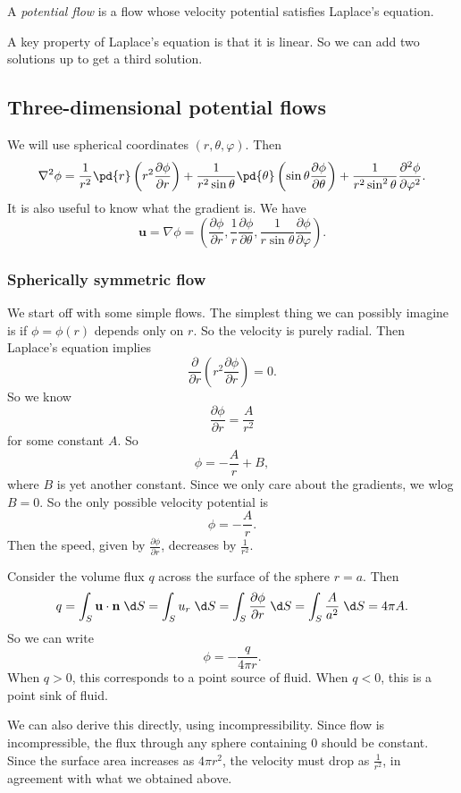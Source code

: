 \documentclass[a4paper]{article}
\begin{document}
\begin{defi}
  A \emph{potential flow} is a flow whose velocity potential satisfies Laplace's equation.
\end{defi}

A key property of Laplace's equation is that it is linear. So we can add two solutions up to get a third solution.

\subsection{Three-dimensional potential flows}
We will use spherical coordinates $(r, \theta, \varphi)$. Then
\[
  \nabla^2 \phi = \frac{1}{r^2} \pd{r} \left(r^2 \frac{\partial \phi}{\partial r}\right) + \frac{1}{r^2 \sin \theta} \pd{\theta} \left(\sin \theta\frac{\partial \phi}{\partial \theta}\right) + \frac{1}{r^2 \sin^2 \theta} \frac{\partial^2 \phi}{\partial \varphi^2}.
\]
It is also useful to know what the gradient is. We have
\[
  \mathbf{u} = \nabla \phi = \left(\frac{\partial \phi}{\partial r}, \frac{1}{r} \frac{\partial \phi}{\partial \theta}, \frac{1}{r \sin \theta} \frac{\partial \phi}{\partial \varphi}\right).
\]
\subsubsection{Spherically symmetric flow}
We start off with some simple flows. The simplest thing we can possibly imagine is if $\phi = \phi(r)$ depends only on $r$. So the velocity is purely radial. Then Laplace's equation implies
\[
  \frac{\partial}{\partial r}\left(r^2 \frac{\partial \phi}{\partial r}\right) = 0.
\]
So we know
\[
  \frac{\partial \phi}{\partial r} = \frac{A}{r^2}
\]
for some constant $A$. So
\[
  \phi = -\frac{A}{r} + B,
\]
where $B$ is yet another constant. Since we only care about the gradients, we wlog $B = 0$. So the only possible velocity potential is
\[
  \phi = -\frac{A}{r}.
\]
Then the speed, given by $\frac{\partial \phi}{\partial r}$, decreases by $\frac{1}{r^2}$.

Consider the volume flux $q$ across the surface of the sphere $r = a$. Then
\[
  q = \int_S \mathbf{u}\cdot \mathbf{n} \;\d S = \int_S u_r \;\d S = \int_S \frac{\partial \phi}{\partial r} \;\d S = \int_S \frac{A}{a^2}\;\d S = 4\pi A.
\]
So we can write
\[
  \phi = -\frac{q}{4\pi r}.
\]
When $q > 0$, this corresponds to a point source of fluid. When $q < 0$, this is a point sink of fluid.

We can also derive this directly, using incompressibility. Since flow is incompressible, the flux through any sphere containing $0$ should be constant. Since the surface area increases as $4\pi r^2$, the velocity must drop as $\frac{1}{r^2}$, in agreement with what we obtained above.
\end{document}
